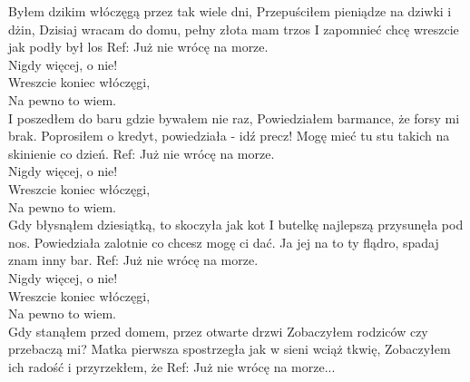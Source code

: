 
\hops
Byłem dzikim włóczęgą przez tak wiele dni, \tab{} \newline
Przepuściłem  pieniądze na dziwki i dżin, \tab{} \newline
Dzisiaj wracam do domu, pełny złota mam trzos \newline
I zapomnieć chcę wreszcie jak podły był los \tab{} \newline
\hops
Ref: Już nie wrócę na morze. \tab{} \\
 Nigdy więcej, o nie!\tab{}  \\
 Wreszcie koniec włóczęgi,\tab{} \\
 Na pewno to wiem. \tab{}  \\
\hops
I poszedłem do baru gdzie bywałem nie raz, \newline
Powiedziałem barmance, że forsy mi brak. \newline
Poprosiłem o kredyt, powiedziała - idź precz! \newline
Mogę mieć tu stu  takich na skinienie co dzień. \newline
\hops
Ref: Już nie wrócę na morze.\\
 Nigdy więcej, o nie! \\
 Wreszcie koniec włóczęgi,\\
 Na pewno to wiem.\\
\hops
Gdy błysnąłem dziesiątką, to skoczyła jak kot \newline
I butelkę najlepszą przysunęła pod nos.  \newline
Powiedziała zalotnie co chcesz mogę ci dać. \newline
Ja jej na to ty flądro, spadaj znam inny bar. \newline
\hops
Ref: Już nie wrócę na morze.\\
 Nigdy więcej, o nie! \\
 Wreszcie koniec włóczęgi,\\
 Na pewno to wiem.\\
\hops
Gdy stanąłem przed domem, przez otwarte drzwi \newline
Zobaczyłem rodziców czy przebaczą mi? \newline
Matka pierwsza spostrzegła jak w sieni wciąż tkwię, \newline
Zobaczyłem ich radość i przyrzekłem, że \newline
\hops
Ref: Już nie wrócę na morze...